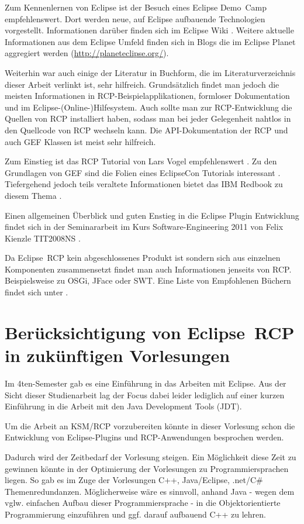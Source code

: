 \documentclass[%
12pt,titlepage,abstracton]{scrreprt}
\begin{document}
Zum Kennenlernen von Eclipse ist der Besuch eines Eclipse Demo~Camp
empfehlenswert. Dort werden neue, auf Eclipse aufbauende Technologien
vorgestellt. Informationen darüber finden sich im Eclipse Wiki
\cite{eclipse:wiki}. Weitere aktuelle Informationen aus dem Eclipse Umfeld
finden sich in Blogs die im Eclipse Planet aggregiert werden
(\url{http://planeteclipse.org/}).

Weiterhin war auch einige der Literatur in Buchform, die im Literaturverzeichnis
dieser Arbeit verlinkt ist, sehr hilfreich. Grundsätzlich findet man jedoch die
meisten Informationen in RCP-Beispielapplikationen, formloser Dokumentation und
im Eclipse-(Online-)Hilfesystem. Auch sollte man zur RCP-Entwicklung die Quellen
von RCP installiert haben, sodass man bei jeder Gelegenheit nahtlos in den
Quellcode von RCP wechseln kann. Die API-Dokumentation der RCP und auch GEF
Klassen ist meist sehr hilfreich.

Zum Einstieg ist das RCP Tutorial von Lars Vogel empfehlenswert \cite{vogelrcp}.
Zu den Grundlagen von GEF sind die Folien eines EclipseCon Tutorials interessant
\cite{gefslides}. Tiefergehend jedoch teils veraltete Informationen bietet
das IBM Redbook zu diesem Thema \cite{gefredbook}.

Einen allgemeinen Überblick und guten Enstieg in die Eclipse Plugin Entwicklung
findet sich in der Seminararbeit im Kurs Software-Engineering 2011 von Felix
Kienzle TIT2008NS \cite{kienzle11}.

Da Eclipse~RCP kein abgeschlossenes Produkt ist sondern sich aus einzelnen
Komponenten zusammensetzt findet man auch Informationen jenseits von RCP.
Beispielsweise zu OSGi\cite{bartlett}, JFace\cite{jfaceaction} oder SWT. Eine
Liste von Empfohlenen Büchern findet sich unter \cite{eclipse-read}.

\section{Berücksichtigung von Eclipse~RCP in zukünftigen Vorlesungen}
Im 4ten-Semester gab es eine Einführung in das Arbeiten mit Eclipse. Aus der
Sicht dieser Studienarbeit lag der Focus dabei leider lediglich auf einer
kurzen Einführung in die Arbeit mit den Java Development Tools (JDT).

Um die Arbeit an KSM/RCP vorzubereiten könnte in dieser Vorlesung schon die
Entwicklung von Eclipse-Plugins und RCP-Anwendungen besprochen werden.

Dadurch wird der Zeitbedarf der Vorlesung steigen. Ein Möglichkeit diese Zeit zu
gewinnen könnte in der Optimierung der Vorlesungen zu Programmiersprachen
liegen.
So gab es im Zuge der Vorlesungen C++, Java/Eclipse, .net/C\# Themenredundanzen.
Möglicherweise wäre es sinnvoll, anhand Java - wegen dem vglw. einfachen Aufbau
dieser Programmiersprache - in die Objektorientierte Programmierung einzuführen
und ggf. darauf aufbauend C++ zu lehren.
\end{document}
